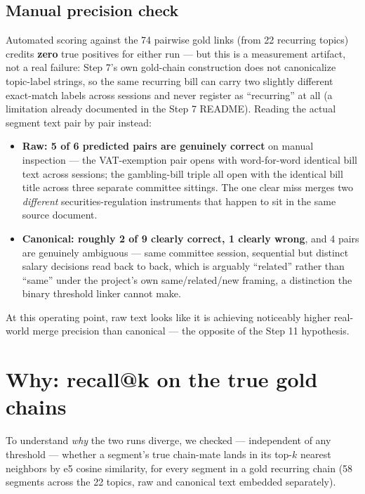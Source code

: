 \documentclass[11pt,a4paper]{article}
\begin{document}
\subsection{Manual precision check}

Automated scoring against the 74 pairwise gold links (from 22 recurring topics) credits
\textbf{zero} true positives for either run --- but this is a measurement artifact, not a
real failure: Step 7's own gold-chain construction does not canonicalize topic-label
strings, so the same recurring bill can carry two slightly different exact-match labels
across sessions and never register as ``recurring'' at all (a limitation already documented
in the Step 7 README). Reading the actual segment text pair by pair instead:

\begin{itemize}[leftmargin=1.4em]
\item \textbf{Raw: 5 of 6 predicted pairs are genuinely correct} on manual inspection --- the
  VAT-exemption pair opens with word-for-word identical bill text across sessions; the
  gambling-bill triple all open with the identical bill title across three separate
  committee sittings. The one clear miss merges two \emph{different} securities-regulation
  instruments that happen to sit in the same source document.
\item \textbf{Canonical: roughly 2 of 9 clearly correct, 1 clearly wrong}, and 4 pairs are
  genuinely ambiguous --- same committee session, sequential but distinct salary decisions
  read back to back, which is arguably ``related'' rather than ``same'' under the project's
  own same/related/new framing, a distinction the binary threshold linker cannot make.
\end{itemize}

At this operating point, raw text looks like it is achieving noticeably higher real-world
merge precision than canonical --- the opposite of the Step 11 hypothesis.

\section{Why: recall@k on the true gold chains}

To understand \emph{why} the two runs diverge, we checked --- independent of any threshold
--- whether a segment's true chain-mate lands in its top-$k$ nearest neighbors by e5 cosine
similarity, for every segment in a gold recurring chain (58 segments across the 22 topics,
raw and canonical text embedded separately).
\end{document}
